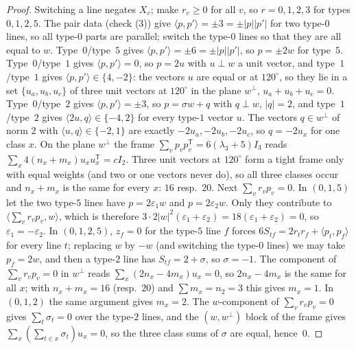 \documentclass[11pt]{article}
\theoremstyle{definition}
\begin{document}
\begin{proof}
Switching a line negates $X_v$; make $r_v\ge0$ for all $v$, so $r=0,1,2,3$ for types $0,1,2,5$. The
pair data (check (3)) give $\langle p,p'\rangle=\pm3=\pm|p||p'|$ for two type-$0$ lines, so all type-$0$
parts are parallel; switch the type-$0$ lines so that they are all equal to $w$. Type~$0$/type~$5$
gives $\langle p,p'\rangle=\pm6=\pm|p||p'|$, so $p=\pm2w$ for type~$5$. Type~$0$/type~$1$ gives
$\langle p,p'\rangle=0$, so $p=2u$ with $u\perp w$ a unit vector, and type~$1$/type~$1$ gives
$\langle p,p'\rangle\in\{4,-2\}$: the vectors $u$ are equal or at $120^\circ$, so they lie in a set
$\{u_a,u_b,u_c\}$ of three unit vectors at $120^\circ$ in the plane $w^\perp$, $u_a+u_b+u_c=0$.
Type~$0$/type~$2$ gives $\langle p,p'\rangle=\pm3$, so $p=\sigma w+q$ with $q\perp w$, $|q|=2$, and
type~$1$/type~$2$ gives $\langle2u,q\rangle\in\{-4,2\}$ for every type-$1$ vector $u$. The vectors
$q\in w^\perp$ of norm $2$ with $\langle u,q\rangle\in\{-2,1\}$ are exactly $-2u_a,-2u_b,-2u_c$, so
$q=-2u_x$ for one class $x$. On the plane $w^\perp$ the frame
$\sum_vp_vp_v^{\mathsf T}=6(\lambda_3+5)I_3$ reads $\sum_x4(n_x+m_x)u_xu_x^{\mathsf T}=cI_2$. Three unit
vectors at $120^\circ$ form a tight frame only with equal weights (and two or one vectors never do), so
all three classes occur and $n_x+m_x$ is the same for every $x$: $16$ resp.\ $20$. Next
$\sum_vr_vp_v=0$. In $(0,1,5)$ let the two type-$5$ lines have $p=2\varepsilon_1w$ and $p=2\varepsilon_2w$.
Only they contribute to $\langle\sum_vr_vp_v,w\rangle$, which is therefore
$3\cdot2|w|^2(\varepsilon_1+\varepsilon_2)=18(\varepsilon_1+\varepsilon_2)=0$, so $\varepsilon_1=-\varepsilon_2$. In $(0,1,2,5)$, $z_f=0$ for the
type-$5$ line $f$ forces $6S_{tf}=2r_tr_f+\langle p_t,p_f\rangle$ for every line $t$; replacing $w$ by $-w$
(and switching the type-$0$ lines) we may take $p_f=2w$, and then a type-$2$ line has
$S_{tf}=2+\sigma$, so $\sigma=-1$. The component of $\sum_vr_vp_v=0$ in $w^\perp$ reads
$\sum_x(2n_x-4m_x)u_x=0$, so $2n_x-4m_x$ is the same for all $x$; with $n_x+m_x=16$ (resp.\ $20$) and
$\sum m_x=n_2=3$ this gives $m_x=1$. In $(0,1,2)$ the same argument gives $m_x=2$. The $w$-component of
$\sum_vr_vp_v=0$ gives $\sum_t\sigma_t=0$ over the type-$2$ lines, and the $(w,w^\perp)$ block of the
frame gives $\sum_x(\sum_{t\in x}\sigma_t)u_x=0$, so the three class sums of $\sigma$ are equal, hence~$0$.
\end{proof}
\end{document}
